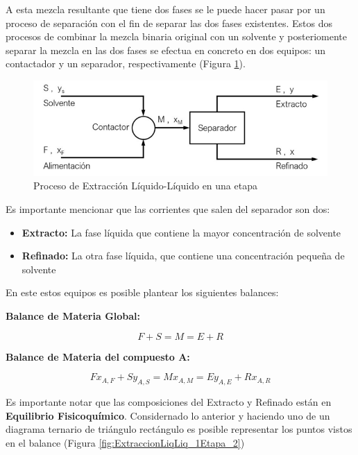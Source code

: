 \documentclass[11pt]{book}
\begin{document}
A esta mezcla resultante que tiene dos fases se le puede hacer pasar por un proceso de separación con el fin de separar las dos fases existentes. Estos dos procesos de combinar la mezcla binaria original con un solvente y posteriomente separar la mezcla en las dos fases se efectua en concreto en dos equipos: un contactador y un separador, respectivamente (Figura \ref{fig:ExtraccionLiqLiq_1Etapa}).

\begin{figure}[H]
    \centering
    \includegraphics[width =12cm]{img/LiquidoLiquido/ExtracionLiqLiq_1Etapa.PNG}
    \caption{Proceso de Extracción Líquido-Líquido en una etapa}
    \label{fig:ExtraccionLiqLiq_1Etapa}
\end{figure}

Es importante mencionar que las corrientes que salen del separador son dos:
\begin{itemize}
    \item \textbf{Extracto:} La fase líquida que contiene la mayor concentración de solvente
    
    \item \textbf{Refinado:} La otra fase líquida, que contiene una concentración pequeña de solvente 
\end{itemize}

En este estos equipos es posible plantear los siguientes balances:

\textbf{Balance de Materia Global:}

\begin{equation}
    \label{eq:Extraccion_LiqLiq_1}
    F + S = M = E + R
\end{equation}

\textbf{Balance de Materia del compuesto A:}

\begin{equation}
    \label{eq:Extraccion_LiqLiq_2}
    F x_{A,F} + S y_{A,S} = M x_{A,M} = E y_{A,E} + R x_{A,R}
\end{equation}

Es importante notar que las composiciones del Extracto y Refinado están en \textbf{Equilibrio Fisicoquímico}. Considernado lo anterior y haciendo uno de un diagrama ternario de triángulo rectángulo es posible representar los puntos vistos en el balance (Figura \ref{fig:ExtraccionLiqLiq_1Etapa_2})
\end{document}
